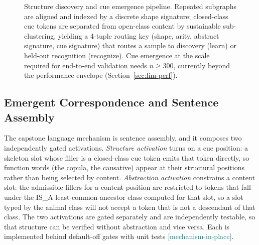 \documentclass[11pt,a4paper]{article}
\newcommand{\statusmech}{\textcolor{teal}{\small\textsf{[mechanism-in-place]}}}
\begin{document}
\begin{figure}[t]
\centering
{}
\caption{Structure discovery and cue emergence pipeline. Repeated subgraphs
are aligned and indexed by a discrete shape signature; closed-class cue
tokens are separated from open-class content by sustainable
sub-clustering, yielding a 4-tuple routing key (shape, arity, abstract
signature, cue signature) that routes a sample to discovery (learn) or
held-out recognition (recognize). Cue emergence at the scale required for
end-to-end validation needs $n \geq 300$, currently beyond the
performance envelope (Section~\ref{sec:lim-perf}).}
\label{fig:discovery}
\end{figure}

\subsection{Emergent Correspondence and Sentence Assembly}
\label{sec:mech-corr}
The capstone language mechanism is sentence assembly, and it composes
two independently gated activations. \emph{Structure activation} turns
on a cue position: a skeleton slot whose filler is a closed-class cue
token emits that token directly, so function words (the copula, the
causative) appear at their structural positions rather than being
selected by content. \emph{Abstraction activation} constrains a content
slot: the admissible fillers for a content position are restricted to
tokens that fall under the IS\_A least-common-ancestor class computed
for that slot, so a slot typed by the animal class will not accept a
token that is not a descendant of that class. The two activations are
gated separately and are independently testable, so that structure can
be verified without abstraction and vice versa. Each is implemented
behind default-off gates with unit tests \statusmech.
\end{document}
